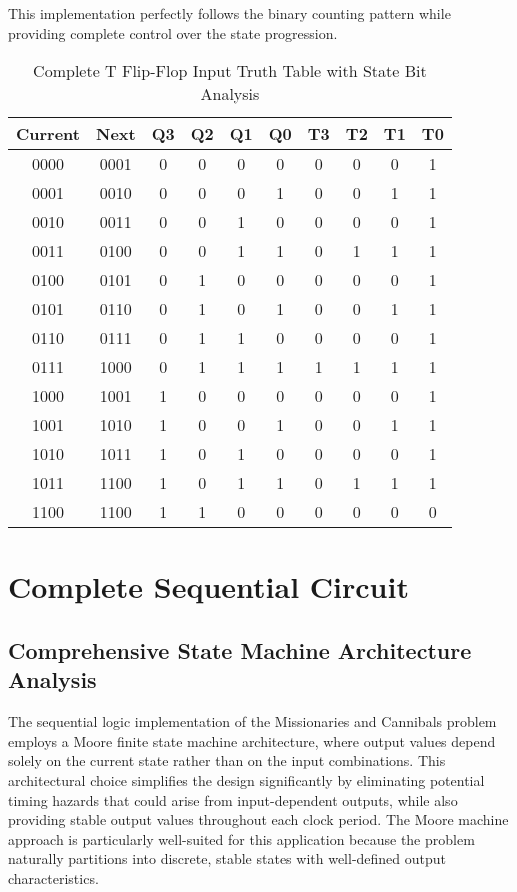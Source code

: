 \documentclass[10pt,a4paper]{article}
\begin{document}
This implementation perfectly follows the binary counting pattern while providing complete control over the state progression.

\begin{table}[H]
\centering
\begin{tabular}{|c|c|c|c|c|c|c|c|c|c|}
\hline
\textbf{Current} & \textbf{Next} & \textbf{Q3} & \textbf{Q2} & \textbf{Q1} & \textbf{Q0} & \textbf{T3} & \textbf{T2} & \textbf{T1} & \textbf{T0} \\
\hline
0000 & 0001 & 0 & 0 & 0 & 0 & 0 & 0 & 0 & 1 \\
0001 & 0010 & 0 & 0 & 0 & 1 & 0 & 0 & 1 & 1 \\
0010 & 0011 & 0 & 0 & 1 & 0 & 0 & 0 & 0 & 1 \\
0011 & 0100 & 0 & 0 & 1 & 1 & 0 & 1 & 1 & 1 \\
0100 & 0101 & 0 & 1 & 0 & 0 & 0 & 0 & 0 & 1 \\
0101 & 0110 & 0 & 1 & 0 & 1 & 0 & 0 & 1 & 1 \\
0110 & 0111 & 0 & 1 & 1 & 0 & 0 & 0 & 0 & 1 \\
0111 & 1000 & 0 & 1 & 1 & 1 & 1 & 1 & 1 & 1 \\
1000 & 1001 & 1 & 0 & 0 & 0 & 0 & 0 & 0 & 1 \\
1001 & 1010 & 1 & 0 & 0 & 1 & 0 & 0 & 1 & 1 \\
1010 & 1011 & 1 & 0 & 1 & 0 & 0 & 0 & 0 & 1 \\
1011 & 1100 & 1 & 0 & 1 & 1 & 0 & 1 & 1 & 1 \\
1100 & 1100 & 1 & 1 & 0 & 0 & 0 & 0 & 0 & 0 \\
\hline
\end{tabular}
\caption{Complete T Flip-Flop Input Truth Table with State Bit Analysis}
\end{table}


\section*{Complete Sequential Circuit}
\subsection*{Comprehensive State Machine Architecture Analysis}

\noindent The sequential logic implementation of the Missionaries and Cannibals problem employs a Moore finite state machine architecture, where output values depend solely on the current state rather than on the input combinations. This architectural choice simplifies the design significantly by eliminating potential timing hazards that could arise from input-dependent outputs, while also providing stable output values throughout each clock period. The Moore machine approach is particularly well-suited for this application because the problem naturally partitions into discrete, stable states with well-defined output characteristics.\\
\end{document}
